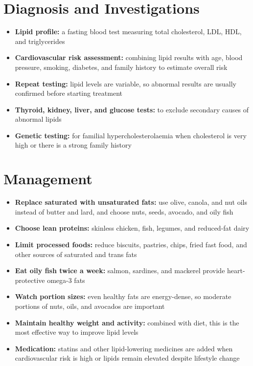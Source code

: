 \section*{Diagnosis and Investigations}
\begin{itemize}
    \item \textbf{Lipid profile:} a fasting blood test measuring total cholesterol, LDL, HDL, and triglycerides
    \item \textbf{Cardiovascular risk assessment:} combining lipid results with age, blood pressure, smoking, diabetes, and family history to estimate overall risk
    \item \textbf{Repeat testing:} lipid levels are variable, so abnormal results are usually confirmed before starting treatment
    \item \textbf{Thyroid, kidney, liver, and glucose tests:} to exclude secondary causes of abnormal lipids
    \item \textbf{Genetic testing:} for familial hypercholesterolaemia when cholesterol is very high or there is a strong family history
\end{itemize}

\section*{Management}
\begin{itemize}
    \item \textbf{Replace saturated with unsaturated fats:} use olive, canola, and nut oils instead of butter and lard, and choose nuts, seeds, avocado, and oily fish
    \item \textbf{Choose lean proteins:} skinless chicken, fish, legumes, and reduced-fat dairy
    \item \textbf{Limit processed foods:} reduce biscuits, pastries, chips, fried fast food, and other sources of saturated and trans fats
    \item \textbf{Eat oily fish twice a week:} salmon, sardines, and mackerel provide heart-protective omega-3 fats
    \item \textbf{Watch portion sizes:} even healthy fats are energy-dense, so moderate portions of nuts, oils, and avocados are important
    \item \textbf{Maintain healthy weight and activity:} combined with diet, this is the most effective way to improve lipid levels
    \item \textbf{Medication:} statins and other lipid-lowering medicines are added when cardiovascular risk is high or lipids remain elevated despite lifestyle change
\end{itemize}

